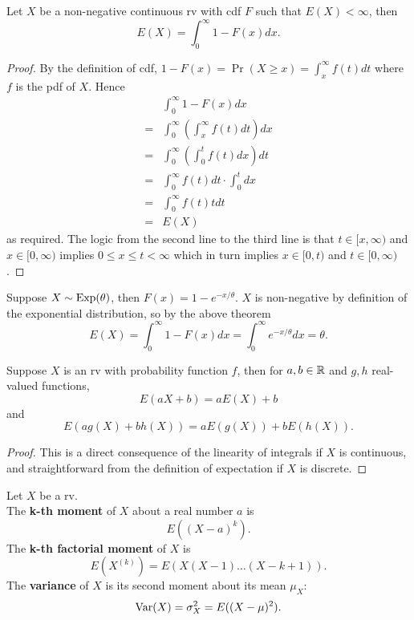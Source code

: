 \documentclass[11pt,fleqn]{book} %
\begin{document}
\begin{theorem} Let \(X\) be a non-negative continuous rv with cdf \(F\) such that \(E(X) < \infty\), then
\[
E(X) = \int_0^\infty 1 - F(x) dx.
\]
\end{theorem}
\begin{proof} By the definition of cdf, \(1 - F(x) = \Pr(X \geq x) = \int_x^\infty f(t)dt\) where \(f\) is the pdf of \(X\). Hence
\[
\begin{aligned}
&\int_0^\infty 1 - F(x)dx \\
= &\int_0^\infty\left(\int_x^\infty f(t)dt\right)dx \\
= &\int_0^\infty\left(\int_0^t f(t)dx\right)dt \\
= &\int_0^\infty f(t)dt \cdot\int_0^t dx \\
= &\int_0^\infty f(t)t dt \\
= &E(X)
\end{aligned}
\]
as required. The logic from the second line to the third line is that \(t \in [x, \infty)\) and \(x \in [0, \infty)\) implies \(0 \leq x \leq t < \infty\) which in turn implies \(x \in [0, t)\) and \(t \in [0, \infty)\).
\end{proof}

\begin{example} Suppose \(X \sim \operatorname{Exp}(\theta)\), then \(F(x) = 1 - e^{-x/\theta}\). \(X\) is non-negative by definition of the exponential distribution, so by the above theorem
\[
E(X) = \int_0^\infty 1 - F(x)dx = \int_0^\infty e^{-x/\theta} dx = \theta.
\]
\end{example}

\begin{theorem} 
Suppose \(X\) is an rv with probability function \(f\), then for \(a, b \in \mathbb{R}\) and \(g, h\) real-valued functions, 
\[
E(aX + b) = aE(X) + b
\]
and
\[
E(ag(X) + bh(X)) = aE(g(X)) + bE(h(X)).
\]
\end{theorem}
\begin{proof} This is a direct consequence of the linearity of integrals if \(X\) is continuous, and straightforward from the definition of expectation if \(X\) is discrete.
\end{proof}

\begin{definition} 
Let \(X\) be a rv.\\
\indent The \textbf{k-th moment} of \(X\) about a real number \(a\) is
\[
E((X - a)^k).
\]
\indent The \textbf{k-th factorial moment} of \(X\) is
\[
E(X^{(k)}) = E(X(X - 1) \ldots (X - k + 1)).
\]
\indent The \textbf{variance} of \(X\) is its second moment about its mean \(\mu_X\):
\[
\operatorname{Var}(X) = \sigma_X^2 = E((X - \mu)^2).
\]
\end{definition}
\end{document}
